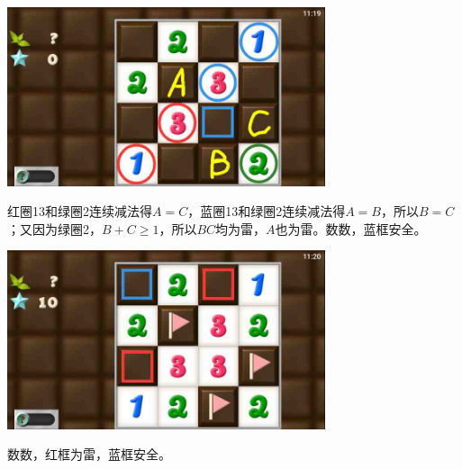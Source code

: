 \subsection{} %
\begin{center}
    \includegraphics[width=0.7\textwidth]{puzzlelow/163-1.jpg}
\end{center}
红圈13和绿圈2连续减法得$A=C$，蓝圈13和绿圈2连续减法得$A=B$，所以$B=C$；又因为绿圈2，$B+C\ge 1$，所以$BC$均为雷，$A$也为雷。数数，蓝框安全。
\begin{center}
    \includegraphics[width=0.7\textwidth]{puzzlelow/163-2.jpg}
\end{center}
数数，红框为雷，蓝框安全。

